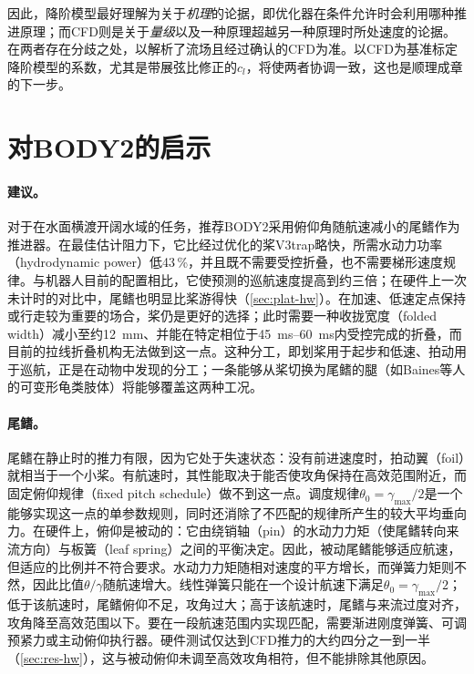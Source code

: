 因此，降阶模型最好理解为关于\emph{机理}的论据，即优化器在条件允许时会利用哪种推进原理；而CFD则是关于\emph{量级}以及一种原理超越另一种原理时所处速度的论据。在两者存在分歧之处，以解析了流场且经过确认的CFD为准。以CFD为基准标定降阶模型的系数，尤其是带展弦比修正的$c_l$，将使两者协调一致，这也是顺理成章的下一步。

\section{对BODY2的启示}
\label{sec:disc-design}
\label{sec:disc-limits-prop}

\paragraph{建议。}对于在水面横渡开阔水域的任务，推荐BODY2采用俯仰角随航速减小的尾鳍作为推进器。在最佳估计阻力下，它比经过优化的桨V3trap略快，所需水动力功率（hydrodynamic power）低43\,\%，并且既不需要受控折叠，也不需要梯形速度规律。与机器人目前的配置相比，它使预测的巡航速度提高到约三倍；在硬件上一次未计时的对比中，尾鳍也明显比桨游得快（\cref{sec:plat-hw}）。在加速、低速定点保持或行走较为重要的场合，桨仍是更好的选择；此时需要一种收拢宽度（folded width）减小至约\SI{12}{\milli\metre}、并能在特定相位于\SIrange{45}{60}{\milli\second}内受控完成的折叠，而目前的拉线折叠机构无法做到这一点。这种分工，即划桨用于起步和低速、拍动用于巡航，正是在动物中发现的分工\cite{Walker2000,Fish1996}；一条能够从桨切换为尾鳍的腿（如Baines等人\cite{Baines2022}的可变形龟类肢体）将能够覆盖这两种工况。

\paragraph{尾鳍。}尾鳍在静止时的推力有限，因为它处于失速状态：没有前进速度时，拍动翼（foil）就相当于一个小桨。有航速时，其性能取决于能否使攻角保持在高效范围附近，而固定俯仰规律（fixed pitch schedule）做不到这一点。调度规律$\theta_0=\gamma_\text{max}/2$是一个能够实现这一点的单参数规则，同时还消除了不匹配的规律所产生的较大平均垂向力。在硬件上，俯仰是被动的：它由绕销轴（pin）的水动力力矩（使尾鳍转向来流方向）与板簧（leaf spring）之间的平衡决定。因此，被动尾鳍能够适应航速，但适应的比例并不符合要求。水动力力矩随相对速度的平方增长，而弹簧力矩则不然，因此比值$\theta/\gamma$随航速增大。线性弹簧只能在一个设计航速下满足$\theta_0=\gamma_\text{max}/2$；低于该航速时，尾鳍俯仰不足，攻角过大；高于该航速时，尾鳍与来流过度对齐，攻角降至高效范围以下。要在一段航速范围内实现匹配，需要渐进刚度弹簧、可调预紧力或主动俯仰执行器。硬件测试仅达到CFD推力的大约四分之一到一半（\cref{sec:res-hw}），这与被动俯仰未调至高效攻角相符，但不能排除其他原因。

